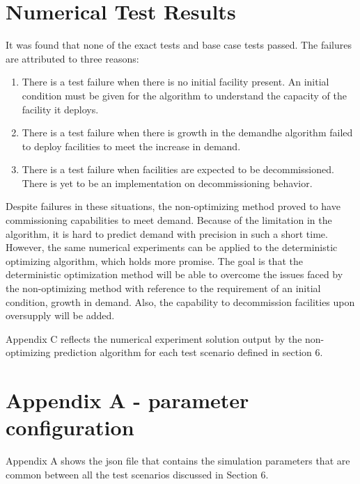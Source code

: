 \documentclass[11pt,letterpaper]{article}
\begin{document}
\section{Numerical Test Results}
It was found that none of the exact tests and base case tests passed. 
The failures are attributed to three reasons:

\begin{enumerate}
	\item There is a test failure when there is no initial facility present. An initial condition must be given for the algorithm to understand the capacity of the facility it deploys.
	\item There is a test failure when there is growth in the demandhe algorithm failed to deploy facilities to meet the increase in demand.
	\item There is a test failure when facilities are expected to be decommissioned. There is yet to be an implementation on decommissioning behavior.
\end{enumerate}

Despite failures in these situations, the non-optimizing method proved to have commissioning capabilities
to meet demand. Because of the limitation in the algorithm, it is hard to predict demand with precision
in such a short time. However, the same numerical experiments can be applied to the deterministic
optimizing algorithm, which holds more promise. The goal is that the deterministic optimization method
will be able to overcome the issues faced by the non-optimizing method with reference to the
requirement of an initial condition, growth in demand. Also, the capability to decommission facilities
upon oversupply will be added.

Appendix C reflects the numerical experiment solution output by the non-optimizing prediction algorithm for each test scenario defined in section 6. 

\pagebreak
\section*{Appendix A - parameter configuration}
Appendix A shows the json file that contains the simulation parameters that are common between all the test scenarios discussed in Section 6.  
\end{document}
